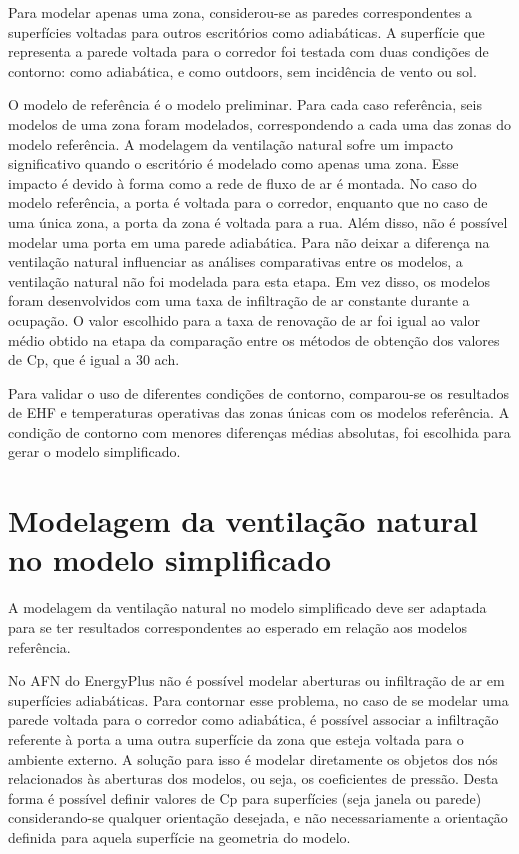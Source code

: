\documentclass[brazil,hardcopy,openany,a5paper]{ufscthesis}
\begin{document}
		Para modelar apenas uma zona, considerou-se as paredes correspondentes a superfícies voltadas para outros escritórios como adiabáticas. A superfície que representa a parede voltada para o corredor foi testada com duas condições de contorno: como adiabática, e como outdoors, sem incidência de vento ou sol.
		
		O modelo de referência é o modelo preliminar. Para cada caso referência, seis modelos de uma zona foram modelados, correspondendo a cada uma das zonas do modelo referência. A modelagem da ventilação natural sofre um impacto significativo quando o escritório é modelado como apenas uma zona. Esse impacto é devido à forma como a rede de fluxo de ar é montada. No caso do modelo referência, a porta é voltada para o corredor, enquanto que no caso de uma única zona, a porta da zona é voltada para a rua. Além disso, não é possível modelar uma porta em uma parede adiabática. Para não deixar a diferença na ventilação natural influenciar as análises comparativas entre os modelos, a ventilação natural não foi modelada para esta etapa. Em vez disso, os modelos foram desenvolvidos com uma taxa de infiltração de ar constante durante a ocupação. O valor escolhido para a taxa de renovação de ar foi igual ao valor médio obtido na etapa da comparação entre os métodos de obtenção dos valores de Cp, que é igual a 30 ach.
		
		Para validar o uso de diferentes condições de contorno, comparou-se os resultados de EHF e temperaturas operativas das zonas únicas com os modelos referência. A condição de contorno com menores diferenças médias absolutas, foi escolhida para gerar o modelo simplificado.
		
		\section{Modelagem da ventilação natural no modelo simplificado}
		
		A modelagem da ventilação natural no modelo simplificado deve ser adaptada para se ter resultados correspondentes ao esperado em relação aos modelos referência.
		
		No AFN do EnergyPlus não é possível modelar aberturas ou infiltração de ar em superfícies adiabáticas. Para contornar esse problema, no caso de se modelar uma parede voltada para o corredor como adiabática, é possível associar a infiltração referente à porta a uma outra superfície da zona que esteja voltada para o ambiente externo. A solução para isso é modelar diretamente os objetos dos nós relacionados às aberturas dos modelos, ou seja, os coeficientes de pressão. Desta forma é possível definir valores de Cp para superfícies (seja janela ou parede) considerando-se qualquer orientação desejada, e não necessariamente a orientação definida para aquela superfície na geometria do modelo.
		
\end{document}
